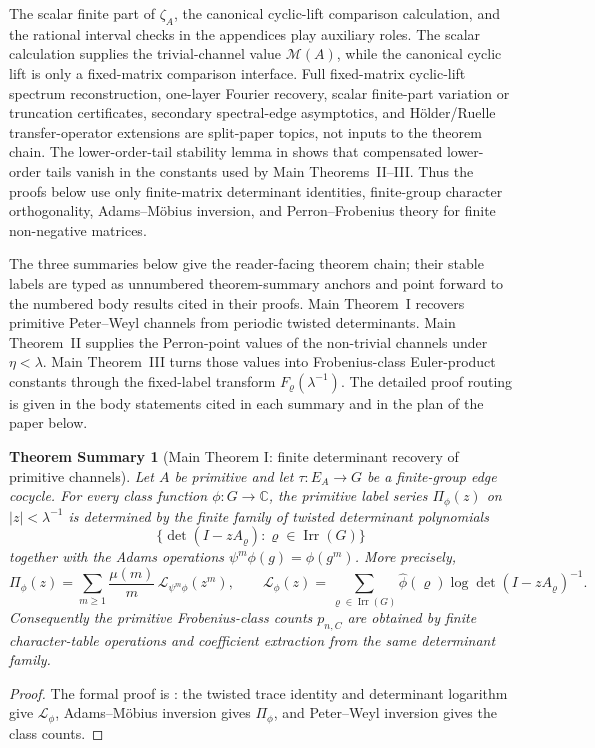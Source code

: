 \documentclass[11pt,a4paper]{amsart}
\theoremstyle{plain}
\newtheorem*{theoremsummary}{Theorem Summary}
\newcounter{theoremsummaryref}
\newcommand{\summaryrefstep}{\refstepcounter{theoremsummaryref}}
\theoremstyle{definition}
\theoremstyle{remark}
\DeclareMathOperator{\Irr}{Irr}
\newcommand{\CC}{\mathbb{C}}
\begin{document}
The scalar finite part of \(\zeta_A\), the canonical cyclic-lift comparison
calculation, and the rational interval checks in the appendices play
auxiliary roles.  The scalar calculation supplies the trivial-channel value
\(\mathcal M(A)\), while the canonical cyclic lift is only a fixed-matrix
comparison interface.  Full fixed-matrix cyclic-lift spectrum reconstruction,
one-layer Fourier recovery, scalar finite-part variation or truncation
certificates, secondary spectral-edge asymptotics, and H\"older/Ruelle
transfer-operator extensions are split-paper topics, not inputs to the theorem
chain.  The lower-order-tail stability lemma in
   shows that compensated
  lower-order tails vanish in the constants used by Main Theorems~II--III. Thus
  the proofs below use only finite-matrix determinant identities, finite-group
  character orthogonality, Adams--M\"obius inversion, and Perron--Frobenius
  theory for finite non-negative matrices.

The three summaries below give the reader-facing theorem chain; their stable
labels are typed as unnumbered theorem-summary anchors and point forward to
the numbered body results cited in their proofs.  Main
Theorem~I recovers primitive Peter--Weyl channels from periodic twisted
determinants.  Main Theorem~II supplies the Perron-point values of the
non-trivial channels under \(\eta<\lambda\).  Main Theorem~III turns those
values into Frobenius-class Euler-product constants through the fixed-label
transform \(F_\varrho(\lambda^{-1})\).  The detailed proof routing is given in
the body statements cited in each summary and in the plan of the paper below.

\begin{theoremsummary}[Main Theorem I: finite determinant recovery of primitive channels]
  \summaryrefstep\label{stmt:main-theorem-i-adams-mobius-linearisation}
  \label{stmt:intro-adams-mobius-linearisation}
  \label{stmt:intro-finite-group}
  \label{stmt:intro-adams-mobius}
  Let \(A\) be primitive and let \(\tau:E_A\to G\) be a finite-group edge
  cocycle.  For every class function \(\phi:G\to\CC\), the primitive
  label series \(\Pi_\phi(z)\) on \(|z|<\lambda^{-1}\) is determined by
  the finite family of twisted determinant polynomials
  \[
    \{\det(I-zA_\varrho):\varrho\in\Irr(G)\}
  \]
  together with the Adams operations \(\psi^m\phi(g)=\phi(g^m)\).  More
  precisely,
  \[
    \Pi_\phi(z)=
    \sum_{m\ge1}\frac{\mu(m)}{m}\,
      \mathcal L_{\psi^m\phi}(z^m),
    \qquad
    \mathcal L_\phi(z)=
    \sum_{\varrho\in\Irr(G)}\widehat\phi(\varrho)
      \log\det(I-zA_\varrho)^{-1}.
  \]
  Consequently the primitive Frobenius-class counts \(p_{n,C}\) are
  obtained by finite character-table operations and coefficient
  extraction from the same determinant family.
\end{theoremsummary}
\begin{proof}
  The formal proof is : the twisted trace
  identity and determinant logarithm give \(\mathcal L_\phi\), Adams--M\"obius
  inversion gives \(\Pi_\phi\), and Peter--Weyl inversion gives the class counts.
\end{proof}
\end{document}

